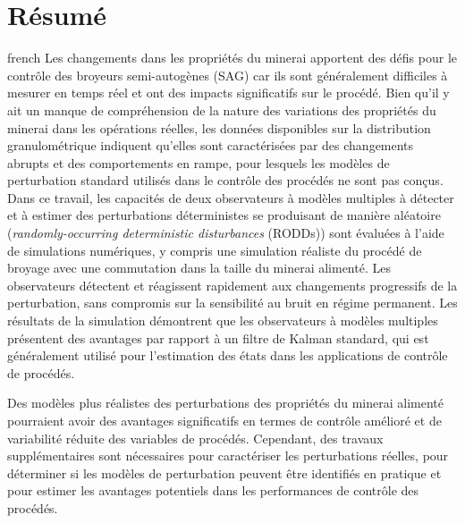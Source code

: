 \chapter*{Résumé}               %
\label{chap-resume}             %

\begin{otherlanguage*}{french}
Les changements dans les propriétés du minerai apportent des défis pour le contrôle des broyeurs semi-autogènes (SAG) car ils sont généralement difficiles à mesurer en temps réel et ont des impacts significatifs sur le procédé. Bien qu'il y ait un manque de compréhension de la nature des variations des propriétés du minerai dans les opérations réelles, les données disponibles sur la distribution granulométrique indiquent qu'elles sont caractérisées par des changements abrupts et des comportements en rampe, pour lesquels les modèles de perturbation standard utilisés dans le contrôle des procédés ne sont pas conçus. Dans ce travail, les capacités de deux observateurs à modèles multiples à détecter et à estimer des perturbations déterministes se produisant de manière aléatoire (\textit{randomly-occurring deterministic disturbances} (\acrshort{RODD}s)) sont évaluées à l'aide de simulations numériques, y compris une simulation réaliste du procédé de broyage avec une commutation dans la taille du minerai alimenté. Les observateurs détectent et réagissent rapidement aux changements progressifs de la perturbation, sans compromis sur la sensibilité au bruit en régime permanent. Les résultats de la simulation démontrent que les observateurs à modèles multiples présentent des avantages par rapport à un filtre de Kalman standard, qui est généralement utilisé pour l'estimation des états dans les applications de contrôle de procédés.

Des modèles plus réalistes des perturbations des propriétés du minerai alimenté pourraient avoir des avantages significatifs en termes de contrôle amélioré et de variabilité réduite des variables de procédés. Cependant, des travaux supplémentaires sont nécessaires pour caractériser les perturbations réelles, pour déterminer si les modèles de perturbation peuvent être identifiés en pratique et pour estimer les avantages potentiels dans les performances de contrôle des procédés.
	

\end{otherlanguage*}
